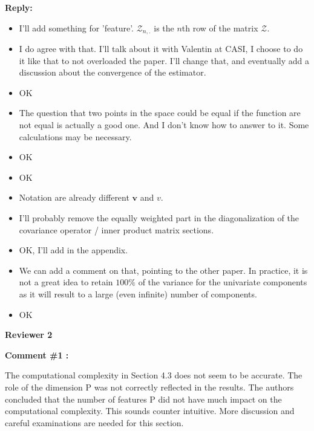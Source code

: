 \documentclass[11pt]{article}
\begin{document}
\medskip

\normalfont

\textbf{Reply:}

\begin{itemize}
  \item I'll add something for 'feature'. $\mathcal{Z}_{n,.}$ is the $n$th row of the matrix $\mathcal{Z}$.
  \item I do agree with that. I'll talk about it with Valentin at CASI, I choose to do it like that to not overloaded the paper. I'll change that, and eventually add a discussion about the convergence of the estimator.
  \item OK
  \item The question that two points in the space could be equal if the function are not equal is actually a good one. And I don't know how to answer to it. Some calculations may be necessary. 
  \item OK
  \item OK
  \item Notation are already different $\boldsymbol{v}$ and $v$.
  \item I'll probably remove the equally weighted part in the diagonalization of the covariance operator / inner product matrix sections.
  \item OK, I'll add in the appendix.
  \item We can add a comment on that, pointing to the other paper. In practice, it is not a great idea to retain $100\%$ of the variance for the univariate components as it will result to a large (even infinite) number of components. 
  \item OK  
\end{itemize}

\vspace*{1cm}


{\large \textbf{Reviewer 2} }


\bigskip

\itshape


\textbf{Comment \#1 :}

The computational complexity in Section 4.3 does not seem to be accurate. The role of the dimension P was not correctly reflected in the results. The authors concluded that the number of features P did not have much impact on the computational complexity. This sounds counter intuitive. More discussion and careful examinations are needed for this section.

\medskip

\normalfont
\end{document}
